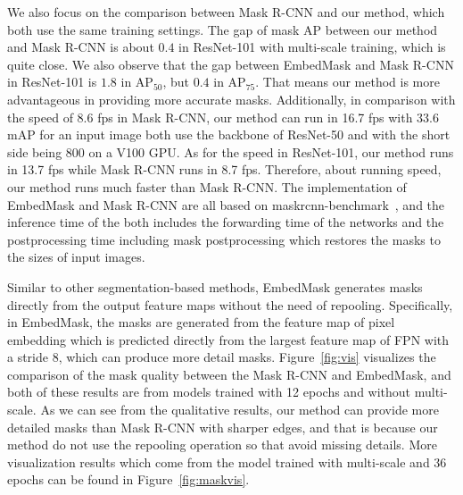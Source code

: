 \documentclass[10pt,twocolumn,letterpaper]{article}
\begin{document}
We also focus on the comparison between Mask R-CNN and our method, which both use the same training settings. 
The gap of mask AP between our method and Mask R-CNN is about $0.4$ in ResNet-101 with multi-scale training, which is quite close. 
We also observe that the gap between EmbedMask and Mask R-CNN in ResNet-101 is $1.8$ in $\text{AP}_{50}$, but $0.4$ in $\text{AP}_{75}$. 
That means our method is more advantageous in providing more accurate masks. 
Additionally, in comparison with the speed of 8.6 fps in Mask R-CNN, our method can run in 16.7 fps with 33.6 mAP for an input image both use the backbone of ResNet-50 and with the short side being 800 on a V100 GPU. 
As for the speed in ResNet-101, our method runs in 13.7 fps while Mask R-CNN runs in 8.7 fps. 
Therefore, about running speed, our method runs much faster than Mask R-CNN.
The implementation of EmbedMask and Mask R-CNN are all based on maskrcnn-benchmark~\cite{massa2018mrcnn}, and the inference time of the both includes the forwarding time of the networks and the postprocessing time including mask postprocessing which restores the masks to the sizes of input images.

\medbreak
{}
Similar to other segmentation-based methods, EmbedMask generates masks directly from the output feature maps without the need of repooling. 
Specifically, in EmbedMask, the masks are generated from the feature map of pixel embedding which is predicted directly from the largest feature map of FPN with a stride 8, which can produce more detail masks. 
Figure~\ref{fig:vis} visualizes the comparison of the mask quality between the Mask R-CNN and EmbedMask, and both of these results are from models trained with 12 epochs and without multi-scale. 
As we can see from the qualitative results, our method can provide more detailed masks than Mask R-CNN with sharper edges, and that is because our method do not use the repooling operation so that avoid missing details. 
More visualization results which come from the model trained with multi-scale and 36 epochs can be found in Figure~\ref{fig:maskvis}. 
\end{document}

